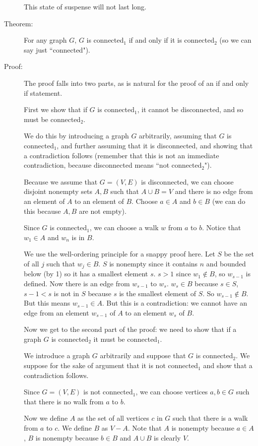 \documentclass[12pt]{article}
\begin{document}
\begin{description}
This state of suspense will not last long.

\item[Theorem:]  For any graph $G$, $G$ is connected$_1$ if and only if it is connected$_2$ (so we can say just ``connected").

\item[Proof:]  The proof falls into two parts, as is natural for the proof of an if and only if statement.

First we show that if $G$ is connected$_1$, it cannot be disconnected, and so must be connected$_2$.

We do this by introducing a graph $G$ arbitrarily, assuming that $G$ is connected$_1$, and further assuming that it is disconnected, and showing that a contradiction follows (remember that this is not an immediate contradiction, because disconnected means ``not connected$_2$").

Because we assume that $G=(V,E)$ is disconnected, we can choose disjoint nonempty sets $A,B$ such that
$A \cup B = V$ and there is no edge from an element of $A$ to an element of $B$.  Choose $a \in A$ and $b \in B$ (we can do this because $A,B$ are not empty).  

Since $G$ is connected$_1$, we can choose a walk $w$ from $a$ to $b$.  Notice that $w_1 \in A$ and $w_n$ is in $B$.

We use the well-ordering principle for a snappy proof here.  Let $S$ be the set of all $j$ such that
$w_j \in B$.  $S$ is nonempty since it contains $n$ and bounded below (by 1) so it has a smallest element $s$.
$s>1$ since $w_1 \not\in B$, so $w_{s-1}$ is defined.  Now there is an edge from $w_{s-1}$ to $w_s$.
$w_s \in B$ because $s \in S$,  $s-1 <s $ is not in $S$ because $s$ is the smallest element of $S$.  So $w_{s-1} \not\in B$.  But this means $w_{s-1} \in A$.  But this is a contradiction:  we cannot have an edge from an element $w_{s-1}$ of $A$ to an element $w_s$ of $B$.

Now we get to the second part of the proof:  we need to show that if a graph $G$ is connected$_2$ it must be connected$_1$.

We introduce a graph $G$ arbitrarily and suppose that $G$ is connected$_2$.  We suppose for the sake of argument that it is not connected$_1$ and show that a contradiction follows.

Since $G=(V,E)$ is not connected$_1$, we can choose vertices $a,b \in G$ such that there is no walk from $a$ to $b$.

Now we define $A$ as the set of all vertices $c$ in $G$ such that there is a walk from $a$ to $c$.  We define $B$ as
$V-A$.  Note that $A$ is nonempty because $a \in A$, $B$ is nonempty because $b \in B$ and $A \cup B$ is clearly $V$.


\end{description}
\end{document}
